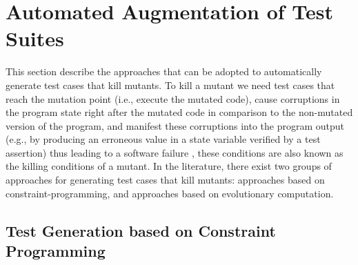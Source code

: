 
\section{Automated Augmentation of Test Suites}
\label{sec:testGeneration}


This section describe the approaches that can be adopted to automatically generate test cases that kill mutants.
To kill a mutant we need test cases that reach the mutation point (i.e., execute the mutated code), cause 
corruptions
in the program state right after the mutated code in comparison to the non-mutated version of the program, 
and manifest these corruptions into the program output 
(e.g., by producing an erroneous value in a state variable verified by a test assertion) 
thus leading to a software failure \cite{papadakis2019mutation}, these conditions are also known as the killing conditions of a mutant.
In the literature, there exist two groups of approaches for 
generating test cases that kill mutants:
approaches based on constraint-programming, and approaches based on evolutionary computation.

\subsection{Test Generation based on Constraint Programming}

